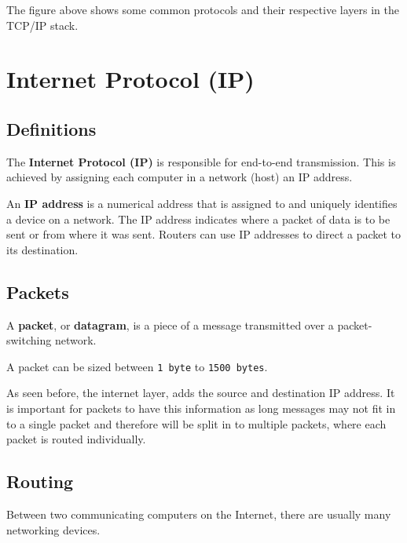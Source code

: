 \documentclass[a4paper]{systems-software}
\begin{document}
The figure above shows some common protocols and their respective layers in the TCP/IP stack.


\section*{Internet Protocol (IP)}

\subsection*{Definitions}

The \textbf{Internet Protocol (IP)} is responsible for end-to-end transmission. This is achieved by assigning each computer in a network (host) an IP address.

An \textbf{IP address} is a numerical address that is assigned to and uniquely identifies a device on a network. The IP address indicates where a packet of data is to be sent or from where it was sent. Routers can use IP addresses to direct a packet to its destination.


\subsection*{Packets}

A \textbf{packet}, or \textbf{datagram}, is a piece of a message transmitted over a packet-switching network.

A packet can be sized between \texttt{1 byte} to \texttt{1500 bytes}.

As seen before, the internet layer, adds the source and destination IP address. It is important for packets to have this information as long messages may not fit in to a single packet and therefore will be  split in to multiple packets, where each packet is routed individually.


\newpage

\subsection*{Routing}

Between two communicating computers on the Internet, there are usually many networking devices.
\end{document}
